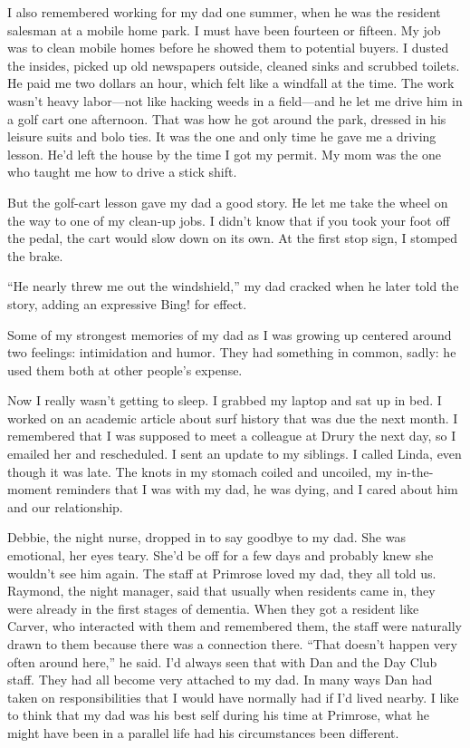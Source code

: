 \documentclass[12pt]{book}
\begin{document}
I also remembered working for my dad one summer, when he was the resident salesman at a mobile home park. I must have been fourteen or fifteen. My job was to clean mobile homes before he showed them to potential buyers. I dusted the insides, picked up old newspapers outside, cleaned sinks and scrubbed toilets. He paid me two dollars an hour, which felt like a windfall at the time. The work wasn't heavy labor---not like hacking weeds in a field---and he let me drive him in a golf cart one afternoon. That was how he got around the park, dressed in his leisure suits and bolo ties. It was the one and only time he gave me a driving lesson. He'd left the house by the time I got my permit. My mom was the one who taught me how to drive a stick shift.

But the golf-cart lesson gave my dad a good story. He let me take the wheel on the way to one of my clean-up jobs. I didn't know that if you took your foot off the pedal, the cart would slow down on its own. At the first stop sign, I stomped the brake.

``He nearly threw me out the windshield,'' my dad cracked when he later told the story, adding an expressive Bing! for effect.

Some of my strongest memories of my dad as I was growing up centered around two feelings: intimidation and humor. They had something in common, sadly: he used them both at other people's expense.

Now I really wasn't getting to sleep. I grabbed my laptop and sat up in bed. I worked on an academic article about surf history that was due the next month. I remembered that I was supposed to meet a colleague at Drury the next day, so I emailed her and rescheduled. I sent an update to my siblings. I called Linda, even though it was late. The knots in my stomach coiled and uncoiled, my in-the-moment reminders that I was with my dad, he was dying, and I cared about him and our relationship.

Debbie, the night nurse, dropped in to say goodbye to my dad. She was emotional, her eyes teary. She'd be off for a few days and probably knew she wouldn't see him again. The staff at Primrose loved my dad, they all told us. Raymond, the night manager, said that usually when residents came in, they were already in the first stages of dementia. When they got a resident like Carver, who interacted with them and remembered them, the staff were naturally drawn to them because there was a connection there. ``That doesn't happen very often around here,'' he said. I'd always seen that with Dan and the Day Club staff. They had all become very attached to my dad. In many ways Dan had taken on responsibilities that I would have normally had if I'd lived nearby. I like to think that my dad was his best self during his time at Primrose, what he might have been in a parallel life had his circumstances been different.
\end{document}
